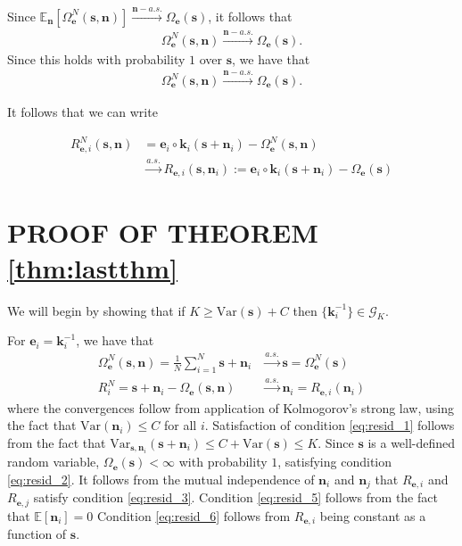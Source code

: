 \documentclass[letterpaper]{article}
\theoremstyle{definition}
\begin{document}
Since $\mathbb{E}_{\bm{n}}[\Omega_{\bm{e}}^N(\bm{s}, \bm{n})] \overset{\bm{n}-a.s.}{\longrightarrow} \Omega_{\bm{e}}(\bm{s})$, it follows that
\begin{align*}
    \Omega_{\bm{e}}^N(\bm{s}, \bm{n}) \overset{\bm{n}-a.s.}{\longrightarrow} \Omega_{\bm{e}}(\bm{s}).
\end{align*}
Since this holds with probability $1$ over $\bm{s}$, we have that
\begin{align*}
    \Omega_{\bm{e}}^N(\bm{s}, \bm{n}) \overset{\bm{n}-a.s.}{\longrightarrow} \Omega_{\bm{e}}(\bm{s}).
\end{align*}

It follows that we can write

\begin{align*}
    R_{\bm{e}, i}^N(\bm{s}, \bm{n}) &= \bm{e}_i\circ \bm{k}_i( \bm{s} + \bm{n}_i) - \Omega_{\bm{e}}^N(\bm{s}, \bm{n}) \\
    &\overset{a.s.}{\longrightarrow} R_{\bm{e}, i}(\bm{s}, \bm{n}_i):= \bm{e}_i\circ \bm{k}_i( \bm{s} + \bm{n}_i) - \Omega_{\bm{e}}(\bm{s})
\end{align*}


\section{PROOF OF THEOREM \ref{thm:lastthm}}
\label{sec:lasttmpr}

We will begin by showing that if $K \geq \mathrm{Var}(\bm{s}) + C$ then $\{ \bm{k}^{-1}_i \}  \in \mathcal{G}_K$.

For $\bm{e}_i = \bm{k}_i^{-1}$, we have that
\begin{align*}
    \Omega_{\bm{e}}^N(\bm{s}, \bm{n}) = \frac{1}{N} \sum_{i=1}^N \bm{s} + \bm{n}_i &\overset{a.s.}{\longrightarrow} \bm{s} = \Omega_{\bm{e}}^N(\bm{s})\\
    R_i^N = \bm{s} + \bm{n}_i - \Omega_{\bm{e}}(\bm{s}, \bm{n})  &\overset{a.s.}{\longrightarrow} \bm{n}_i = R_{\bm{e}, i}(\bm{n}_i)
\end{align*}
where the convergences follow from application of Kolmogorov's strong law, using the fact that $\mathrm{Var}(\bm{n}_i) \leq C$ for all $i$.
Satisfaction of condition \ref{eq:resid_1} follows from the fact that $\mathrm{Var}_{\bm{s}, \bm{n}_i} (\bm{s} + \bm{n}_i) \leq C + \mathrm{Var}(\bm{s}) \leq K$.
Since $\bm{s}$ is a well-defined random variable,  $\Omega_{\bm{e}}(\bm{s}) < \infty$ with probability $1$, satisfying condition \ref{eq:resid_2}.
It follows from the mutual independence of $\bm{n}_i$ and $\bm{n}_j$ that $R_{\bm{e}, i}$ and $R_{\bm{e}, j}$ satisfy condition \ref{eq:resid_3}.
Condition \ref{eq:resid_5} follows from the fact that $\mathbb{E}[\bm{n}_i]=0$
Condition \ref{eq:resid_6} follows from $R_{\bm{e}, i}$ being constant as a function of $\bm{s}$.
\end{document}
